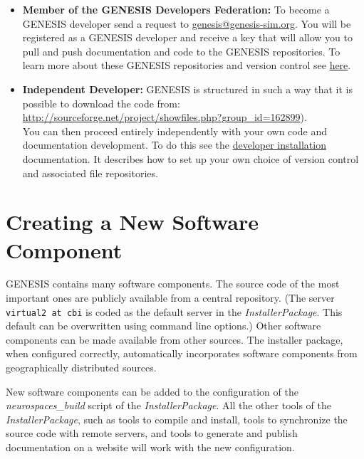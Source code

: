 \documentclass[12pt]{article}
\begin{document}
\begin{itemize}
	\item {\bf Member of the GENESIS Developers Federation:} To become a GENESIS developer send a request to 
	\href{mailto:genesis@genesis-sim.org}{genesis@genesis-sim.org}. You will be registered as a GENESIS developer 
	and receive a key that will allow you to pull and push documentation and code to the GENESIS repositories. To learn more 
	about these GENESIS repositories and version control see \href{../document-versionctrl/document-versionctrl.tex}{here}.
	
	\item {\bf Independent Developer:} GENESIS is structured in such a way that it is possible to download the code from:\\
	\href{\href{http://sourceforge.net/project/showfiles.php?group_id=162899}{http://sourceforge.net/project/showfiles.php?group
	\_id=162899}}{\href{http://sourceforge.net/project/showfiles.php?group_id=162899}{http://sourceforge.net/project/showfiles.php?group\_id=162899}}).\\
	You can then proceed entirely independently with your own code and documentation development. To do this see the 
	\href{../introduction-installation-developer}{developer installation} documentation. It describes how to set up your own 
	choice of version control and associated file repositories.

\end{itemize}

\section*{Creating a New Software Component}

GENESIS contains many software components. The source code of the most important ones are publicly available from a central repository. (The server {\tt virtual2 at cbi} is coded as the default server in the {\it InstallerPackage}. This default can be overwritten using command line options.) Other software components can be made available from other sources. The installer package, when configured correctly, automatically incorporates software components from geographically distributed sources.

New software components can be added to the configuration of the {\it neurospaces\_build} script of the {\it InstallerPackage}. All the other tools of the {\it InstallerPackage}, such as tools to compile and install, tools to synchronize the source code with remote servers, and tools to generate and publish documentation on a website will work with the new configuration.
\end{document}
